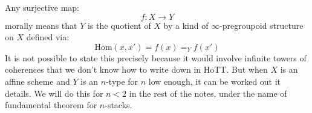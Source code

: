 Any surjective map:
\[f:X\to Y\]
morally means that $Y$ is the quotient of $X$ by a kind of $\infty$-pregroupoid structure on $X$ defined via:
\[\mathrm{Hom}(x,x') = f(x)=_Yf(x')\]
It is not possible to state this precisely because it would involve infinite towers of coherences that we don't know how to write down in HoTT. But when $X$ is an affine scheme and $Y$ is an $n$-type for $n$ low enough, it can be worked out it details. We will do this for $n<2$ in the rest of the notes, under the name of fundamental theorem for $n$-stacks.

